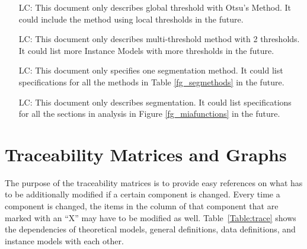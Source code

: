 \documentclass[12pt]{article}
\begin{document}
\noindent \begin{itemize}

\item[LC\refstepcounter{lcnum}\thelcnum\label{LC_localthres}:]This document only describes global threshold with Otsu's Method. It could include the method using local thresholds in the future.

\item[LC\refstepcounter{lcnum}\thelcnum\label{LC_morek}:]This document only describes multi-threshold method with 2 thresholds. It could list more Instance Models with more thresholds in the future.

\item[LC\refstepcounter{lcnum}\thelcnum\label{LC_allmethods}:]This document only specifies one segmentation method. It could list specifications for all the methods in Table \ref{fg_segmethods} in the future.

\item[LC\refstepcounter{lcnum}\thelcnum\label{LC_allanalysis}:]This document only describes segmentation. It could list specifications for all the sections in analysis in Figure \ref{fg_miafunctions} in the future.

\end{itemize}

\section{Traceability Matrices and Graphs}

The purpose of the traceability matrices is to provide easy references on what has to be additionally modified if a certain component is changed.  Every time a component is changed, the items in the column of that component that are marked with an ``X'' may have to be modified as well.  Table~\ref{Table:trace} shows the
dependencies of theoretical models, general definitions, data definitions, and instance models with each other.
\end{document}
